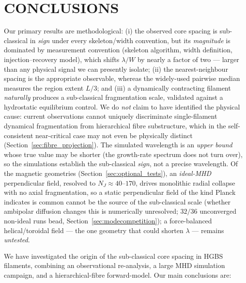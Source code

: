 \documentclass[usenatbib,twoside,twocolumn]{mnras}
\begin{document}
\section{CONCLUSIONS}

Our primary results are methodological: (i) the observed core spacing is sub-classical in \emph{sign} under every skeleton/width convention, but its \emph{magnitude} is dominated by measurement convention (skeleton algorithm, width definition, injection--recovery model), which shifts $\lambda/W$ by nearly a factor of two --- larger than any physical signal we can presently isolate; (ii) the nearest-neighbour spacing is the appropriate observable, whereas the widely-used pairwise median measures the region extent $L/3$; and (iii) a dynamically contracting filament \emph{naturally} produces a sub-classical fragmentation scale, validated against a hydrostatic equilibrium control. We do \emph{not} claim to have identified the physical cause: current observations cannot uniquely discriminate single-filament dynamical fragmentation from hierarchical fibre substructure, which in the self-consistent near-critical case may not even be physically distinct (Section~\ref{sec:fibre_projection}). The simulated wavelength is an \emph{upper bound} whose true value may be shorter (the growth-rate spectrum does not turn over), so the simulations establish the sub-classical \emph{sign}, not a precise wavelength. Of the magnetic geometries (Section~\ref{sec:optional_tests}), an \emph{ideal-MHD} perpendicular field, resolved to $N_J\approx40$--$170$, drives monolithic radial collapse with no axial fragmentation, so a static perpendicular field of the kind Planck indicates is common cannot be the source of the sub-classical scale (whether ambipolar diffusion changes this is numerically unresolved; $32/36$ unconverged non-ideal runs bead, Section~\ref{sec:modecompetition}); a force-balanced helical/toroidal field --- the one geometry that could shorten $\lambda$ --- remains \emph{untested}.

We have investigated the origin of the sub-classical core spacing in HGBS filaments, combining an observational re-analysis, a large MHD simulation campaign, and a hierarchical-fibre forward-model. Our main conclusions are:
\end{document}
